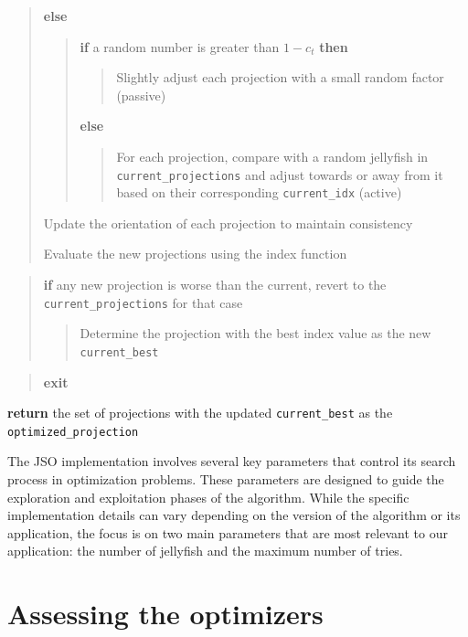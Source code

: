 \documentclass[
  12pt,
]{interact}
\theoremstyle{plain}
\begin{document}
\begin{tcolorbox}
\begin{quote}
\textbf{else}

\begin{quote}
\textbf{if} a random number is greater than \(1 - c_t\) \textbf{then}

\begin{quote}
Slightly adjust each projection with a small random factor (passive)
\end{quote}

\textbf{else}

\begin{quote}
For each projection, compare with a random jellyfish in
\texttt{current\_projections} and adjust towards or away from it based
on their corresponding \texttt{current\_idx} (active)
\end{quote}
\end{quote}

Update the orientation of each projection to maintain consistency

Evaluate the new projections using the index function
\end{quote}

\begin{quote}
\textbf{if} any new projection is worse than the current, revert to the
\texttt{current\_projections} for that case

\begin{quote}
Determine the projection with the best index value as the new
\texttt{current\_best}
\end{quote}
\end{quote}

\begin{quote}
\textbf{exit}
\end{quote}

\textbf{return} the set of projections with the updated
\texttt{current\_best} as the \texttt{optimized\_projection}

\end{tcolorbox}

The JSO implementation involves several key parameters that control its
search process in optimization problems. These parameters are designed
to guide the exploration and exploitation phases of the algorithm. While
the specific implementation details can vary depending on the version of
the algorithm or its application, the focus is on two main parameters
that are most relevant to our application: the number of jellyfish and
the maximum number of tries.

\section{Assessing the optimizers}\label{sec-sim-deets}
\end{document}
